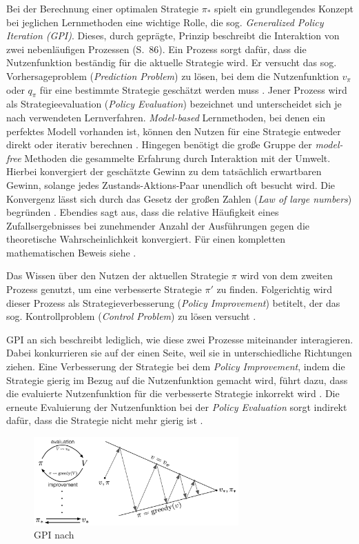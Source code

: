 Bei der Berechnung einer optimalen Strategie $\pi_*$ spielt ein grundlegendes Konzept  bei jeglichen Lernmethoden eine wichtige Rolle, die sog. \textit{Generalized Policy Iteration (GPI)}. Dieses, durch \cite{Sutton1998} geprägte, Prinzip beschreibt die Interaktion von zwei nebenläufigen Prozessen (S.~86). Ein Prozess sorgt dafür, dass die Nutzenfunktion beständig für die aktuelle Strategie wird. Er versucht das sog. Vorhersageproblem (\textit{Prediction Problem}) zu lösen, bei dem die Nutzenfunktion $v_{\pi}$ oder $q_{\pi}$ für eine bestimmte Strategie geschätzt werden muss \cite[S.~18]{Wiering}. Jener Prozess wird als Strategieevaluation (\textit{Policy Evaluation}) bezeichnet und unterscheidet sich je nach verwendeten Lernverfahren. \textit{Model-based} Lernmethoden, bei denen ein perfektes Modell vorhanden ist, können den Nutzen für eine Strategie entweder direkt oder iterativ berechnen \cite[S.~18]{Wiering}. Hingegen benötigt die große Gruppe der \textit{model-free} Methoden die gesammelte Erfahrung durch  Interaktion mit der Umwelt. Hierbei konvergiert der geschätzte Gewinn zu dem tatsächlich erwartbaren Gewinn, solange jedes Zustands-Aktions-Paar unendlich oft besucht wird. Die Konvergenz lässt sich durch das \glqq Gesetz der großen Zahlen\grqq{} (\textit{Law of large numbers}) begründen \cite[S.~94]{Sutton1998}.
Ebendies sagt aus, dass die relative Häufigkeit eines Zufallsergebnisses bei zunehmender Anzahl der Ausführungen gegen die theoretische Wahrscheinlichkeit konvergiert. Für einen kompletten mathematischen Beweis siehe \cite[S.~181-189]{dekking2006modern}.
\par 
Das Wissen über den Nutzen der aktuellen Strategie $\pi$ wird von dem zweiten Prozess genutzt, um eine verbesserte Strategie $\pi'$ zu finden. Folgerichtig wird dieser Prozess als Strategieverbesserung (\textit{Policy Improvement}) betitelt, der das sog. Kontrollproblem (\textit{Control Problem}) zu lösen versucht \cite[S.~18]{Wiering}.
\par 
GPI an sich beschreibt lediglich, wie diese zwei Prozesse miteinander interagieren. Dabei konkurrieren sie auf der einen Seite, weil sie in unterschiedliche Richtungen ziehen. Eine Verbesserung der Strategie bei dem \textit{Policy Improvement}, indem die Strategie gierig im Bezug auf die Nutzenfunktion gemacht wird, führt dazu, dass die evaluierte Nutzenfunktion für die verbesserte Strategie inkorrekt wird \cite[S.~86]{Sutton1998}. Die erneute Evaluierung der Nutzenfunktion bei der \textit{Policy Evaluation} sorgt indirekt dafür, dass die Strategie nicht mehr gierig ist \cite[S.~86]{Sutton1998}.
\par 
\begin{figure}[H]
    \centering
    \includegraphics[width=0.7\textwidth]{images/gpi.jpg}
    \caption{GPI nach \cite[S.~86f]{Sutton1998}}
    \label{fig:GPI}
\end{figure}

